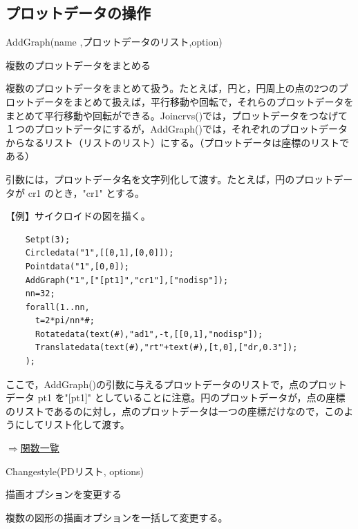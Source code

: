 \documentclass[papersize,a4paper,12pt,uplatex]{jsarticle}
\begin{document}
\subsection{プロットデータの操作}
\begin{description}

\hypertarget{addgraph}{}
\item[関数]  AddGraph(name ,プロットデータのリスト,option)
\item[機能]  複数のプロットデータをまとめる
\item[説明]  複数のプロットデータをまとめて扱う。たとえば，円と，円周上の点の2つのプロットデータをまとめて扱えば，平行移動や回転で，それらのプロットデータをまとめて平行移動や回転ができる。Joincrvs()では，プロットデータをつなげて１つのプロットデータにするが，AddGraph()では，それぞれのプロットデータからなるリスト（リストのリスト）にする。（プロットデータは座標のリストである）

引数には，プロットデータ名を文字列化して渡す。たとえば，円のプロットデータが cr1 のとき，"cr1" とする。

\vspace{\baselineskip}
【例】サイクロイドの図を描く。
\begin{verbatim}
    Setpt(3);
    Circledata("1",[[0,1],[0,0]]);
    Pointdata("1",[0,0]);
    AddGraph("1",["[pt1]","cr1"],["nodisp"]);
    nn=32;
    forall(1..nn,
      t=2*pi/nn*#;
      Rotatedata(text(#),"ad1",-t,[[0,1],"nodisp"]);
      Translatedata(text(#),"rt"+text(#),[t,0],["dr,0.3"]);
    );
\end{verbatim}

\vspace{\baselineskip}
\hspace{20mm}  

ここで，AddGraph()の引数に与えるプロットデータのリストで，点のプロットデータ pt1 を"[pt1]" としていることに注意。円のプロットデータが，点の座標のリストであるのに対し，点のプロットデータは一つの座標だけなので，このようにしてリスト化して渡す。

\begin{flushright}  \hyperlink{functionlist}{$\Rightarrow$関数一覧}\end{flushright}

\hypertarget{changestyle}{}
\item[関数]  Changestyle(PDリスト, options)
\item[機能]  描画オプションを変更する
\item[説明]  複数の図形の描画オプションを一括して変更する。


\end{description}
\end{document}
